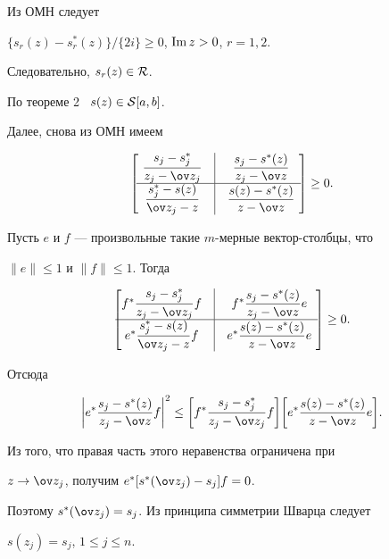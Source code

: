 \begin{pf}


Из ОМН следует


$\{s_r(z)-s_r^*(z)\} / \{2i\} \geq 0$, $\operatorname{Im} z >0$, $r=1,2$.


Следовательно, $s_r(z) \in {\cal R}$.


По теореме 2 \ $s(z) \in {\cal S}[a,b]$.


Далее, снова из ОМН имеем


$$


\left[\ \begin{matrix}


\dfrac{s_j -s^*_j}{z_j-\ov z_j} & \vline &


\dfrac{s_j-s^*(z)}{z_j-\ov z} \\


\hline


\dfrac{s^*_j-s(z)}{\ov z_j - z} & \vline & \dfrac{s(z)-s^*(z)}{z-\ov z}


\end{matrix}


\ \right]


\geq 0.


$$


Пусть $e$ и $f$ --- произвольные такие $m$-мерные вектор-столбцы, что


$\|e\| \leq 1$ и $\|f\| \leq 1$. Тогда


$$


\left[ \begin{matrix}


f^* \dfrac{s_j-s^*_j}{z_j-\ov z_j}f & \vline &


f^* \dfrac{s_j-s^*(z)}{z_j-\ov z}e \\


\hline


e^* \dfrac{s^*_j-s(z)}{\ov z_j- z}f & \vline &


e^* \dfrac{s(z)-s^*(z)}{z -\ov z}e


\end{matrix}\ \right]


\geq 0.


$$


Отсюда


$$


\bigg| e^* \frac{s_j-s^*(z)}{z_j-\ov z} f\bigg|^2 \leq


\bigg[f^* \frac{s_j-s^*_j}{z_j-\ov z_j}f \bigg]


\bigg[e^* \frac{s(z)-s^*(z)}{z-\ov z}e \bigg].


$$


Из того, что правая часть этого неравенства ограничена при


$z \to \ov z_j$, получим $e^*[s^*(\ov z_j)-s_j]f=0$.


Поэтому $s^*(\ov z_j)=s_j$. Из принципа симметрии Шварца следует


$s(z_j)=s_j$, $1 \leq j \leq n$.


\end{pf}





